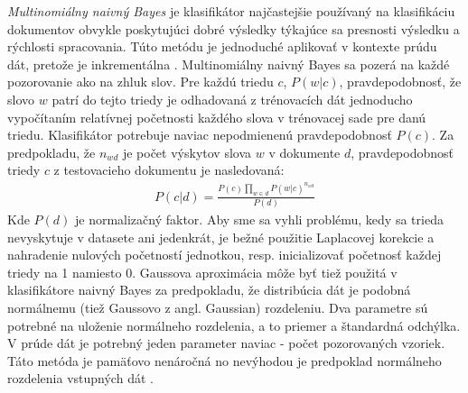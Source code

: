 \textit{Multinomiálny naivný Bayes} je klasifikátor najčastejšie používaný na klasifikáciu dokumentov obvykle poskytujúci dobré výsledky týkajúce sa presnosti výsledku a rýchlosti spracovania. Túto metódu je jednoduché aplikovať v kontexte prúdu dát, pretože je inkrementálna \citep{bifet2010sentiment}. Multinomiálny naivný Bayes sa pozerá na každé pozorovanie ako na zhluk slov. Pre každú triedu $c$, $P(w|c)$, pravdepodobnosť, že slovo $w$ patrí do tejto triedy je odhadovaná z trénovacích dát jednoducho vypočítaním relatívnej početnosti každého slova v trénovacej sade pre danú triedu. Klasifikátor potrebuje naviac nepodmienenú pravdepodobnosť $P(c)$. Za predpokladu, že $\displaystyle n_{wd}$ je počet výskytov slova $w$ v dokumente $d$, pravdepodobnosť triedy $c$ z testovacieho dokumentu je nasledovaná: \newline
\begin{align*}
P(c|d) = \frac{P(c)\prod _{w \in d} P(w|c)^{n_{wd}}} {P(d)}
\end{align*}
Kde $P(d)$ je normalizačný faktor. Aby sme sa vyhli problému, kedy sa trieda nevyskytuje v datasete ani jedenkrát, je bežné použitie Laplacovej korekcie a nahradenie nulových početností jednotkou, resp. inicializovať početnosť každej triedy na 1 namiesto 0. Gaussova aproximácia môže byť tiež použitá v klasifikátore naivný Bayes za predpokladu, že distribúcia dát je podobná normálnemu (tiež Gaussovo z angl. Gaussian) rozdeleniu. Dva parametre sú potrebné na uloženie normálneho rozdelenia, a to priemer a štandardná odchýlka. V prúde dát je potrebný jeden parameter naviac - počet pozorovaných vzoriek. Táto metóda je pamäťovo nenáročná no nevýhodou je predpoklad normálneho rozdelenia vstupných dát \citep{salperwyck2015incremental}.

